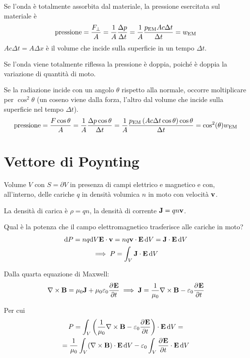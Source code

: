 Se l'onda è totalmente assorbita dal materiale, la pressione esercitata sul materiale è
\begin{equation}
    \text{pressione} = \frac{F_\perp}{A} = \frac{1}{A} \frac{\Delta p}{\Delta t}
    = \frac{1}{A} \frac{p_\mathrm{EM} A c \Delta t}{\Delta t}
    = w_\mathrm{EM}
\end{equation}
$A c \Delta t = A \Delta x$ è il volume che incide sulla superficie in un tempo $\Delta t$.

Se l'onda viene totalmente riflessa la pressione è doppia, poiché è doppia la variazione di quantità di moto.


Se la radiazione incide con un angolo $\theta$ rispetto alla normale, occorre moltiplicare per $\cos^2\theta$ (un coseno viene dalla forza, l'altro dal volume che incide sulla superficie nel tempo $\Delta t$).
\begin{equation}
    \text{pressione} = \frac{F \cos\theta}{A} = \frac{1}{A} \frac{\Delta p \cos \theta}{\Delta t}
    = \frac{1}{A} \frac{p_\mathrm{EM} \left( A c \Delta t \cos \theta \right) \cos \theta}{\Delta t}
    = \cos^2(\theta) w_\mathrm{EM}
\end{equation}


\section{Vettore di Poynting}

Volume $V$ con $S = \partial V$ in presenza di campi elettrico e magnetico e con, all'interno, delle cariche $q$ in densità volumica $n$ in moto con velocità $\mathbf{v}$.

La densità di carica è $\rho = qn$, la densità di corrente $\mathbf{J} = qn\mathbf{v}$.

Qual è la potenza che il campo elettromagnetico trasferisce alle cariche in moto?
\begin{gather}
    \mathrm{d} P = n q \mathrm{d} V \mathbf{E} \cdot \mathbf{v} = n q \mathbf{v} \cdot \mathbf{E} \,\mathrm{d} V = \mathbf{J} \cdot \mathbf{E} \,\mathrm{d} V \\
    \implies P = \int_V \mathbf{J} \cdot \mathbf{E} \,\mathrm{d} V
\end{gather}

Dalla quarta equazione di Maxwell:
\begin{equation}
    \curl \B = \mu_0 \dcurr + \mu_0 \eps_0 \parder[\E]{t}
    \implies
    \dcurr = \frac{1}{\mu_0} \curl \B - \eps_0 \parder[\E]{t}
\end{equation}

Per cui
\begin{equation}
\label{eq:potenza1}
\begin{gathered}
    P = \int_V \pts{\frac{1}{\mu_0} \curl \B - \eps_0 \parder[\E]{t}} \cdot \E \,\de V = \\
    = \frac{1}{\mu_0} \int_V (\curl \B) \cdot \E \,\de V - \eps_0 \int_V \parder[\E]{t} \cdot \E \,\de V
\end{gathered}
\end{equation}

